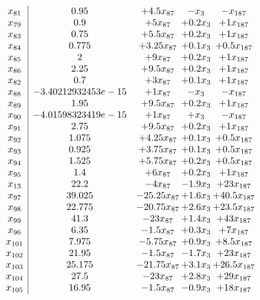 \documentclass[11pt]{article}
\begin{document}
\[\begin{array}{c| c c@{\hskip 2pt} c@{\hskip 2pt} c@{\hskip 2pt} }
 x_{81}   &  0.95 & + 4.5 x_{87} & - x_{3} & - x_{187}\\
 x_{79}   &  0.9 & + 5 x_{87} & + 0.2 x_{3} & + 1 x_{187}\\
 x_{83}   &  0.75 & + 5.5 x_{87} & + 0.2 x_{3} & + 1 x_{187}\\
 x_{84}   &  0.775 & + 3.25 x_{87} & + 0.1 x_{3} & + 0.5 x_{187}\\
 x_{85}   &  2 & + 9 x_{87} & + 0.2 x_{3} & + 1 x_{187}\\
 x_{86}   &  2.25 & + 9.5 x_{87} & + 0.2 x_{3} & + 1 x_{187}\\
 x_{82}   &  0.7 & + 3 x_{87} & + 0.1 x_{3} & + 1 x_{187}\\
 x_{88}   &  -3.40212932453e-15 & + 1 x_{87} & - x_{3} & - x_{187}\\
 x_{89}   &  1.95 & + 9.5 x_{87} & + 0.2 x_{3} & + 1 x_{187}\\
 x_{90}   &  -4.01598323419e-15 & + 1 x_{87} & +  x_{3} & - x_{187}\\
 x_{91}   &  2.75 & + 9.5 x_{87} & + 0.2 x_{3} & + 1 x_{187}\\
 x_{92}   &  1.075 & + 4.25 x_{87} & + 0.1 x_{3} & + 0.5 x_{187}\\
 x_{93}   &  0.925 & + 3.75 x_{87} & + 0.1 x_{3} & + 0.5 x_{187}\\
 x_{94}   &  1.525 & + 5.75 x_{87} & + 0.2 x_{3} & + 0.5 x_{187}\\
 x_{95}   &  1.4 & + 6 x_{87} & + 0.2 x_{3} & + 1 x_{187}\\
 x_{13}   &  22.2 & -4 x_{87} & -1.9 x_{3} & + 23 x_{187}\\
 x_{97}   &  39.025 & -25.25 x_{87} & + 1.6 x_{3} & + 40.5 x_{187}\\
 x_{98}   &  22.775 & -20.75 x_{87} & + 2.6 x_{3} & + 23.5 x_{187}\\
 x_{99}   &  41.3 & -23 x_{87} & + 1.4 x_{3} & + 43 x_{187}\\
 x_{96}   &  6.35 & -1.5 x_{87} & + 0.3 x_{3} & + 7 x_{187}\\
 x_{101}   &  7.975 & -5.75 x_{87} & + 0.9 x_{3} & + 8.5 x_{187}\\
 x_{102}   &  21.95 & -1.5 x_{87} & -1.7 x_{3} & + 23 x_{187}\\
 x_{103}   &  25.175 & -21.75 x_{87} & + 3.1 x_{3} & + 26.5 x_{187}\\
 x_{104}   &  27.5 & -23 x_{87} & + 2.8 x_{3} & + 29 x_{187}\\
 x_{105}   &  16.95 & -1.5 x_{87} & -0.9 x_{3} & + 18 x_{187}\\

\end{array}\]
\end{document}
